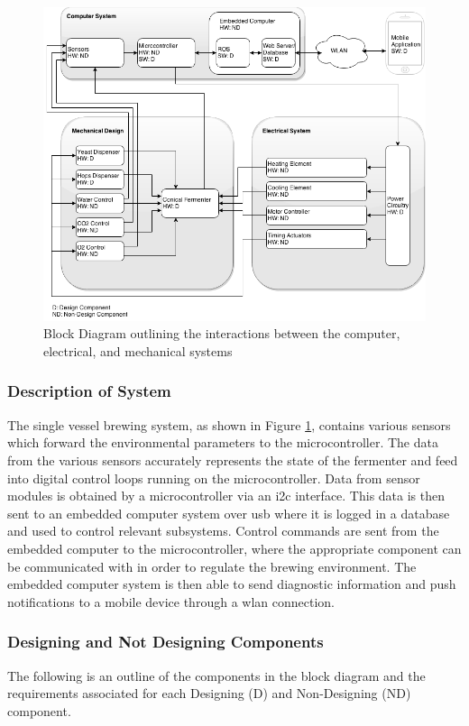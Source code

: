 \documentclass{article}
\begin{document}
\begin{figure}[H]
\begin{center}
\includegraphics[scale=0.58]{block-diagram.png}
\caption{Block Diagram outlining the interactions between the computer, electrical, and mechanical systems}
\label{fig:block}
\end{center}
\end{figure}

\subsubsection{Description of System}
The single vessel brewing system, as shown in Figure \ref{fig:block}, contains various sensors which forward the environmental parameters to the microcontroller. The data from the various sensors accurately represents the state of the fermenter and feed into digital control loops running on the microcontroller.  Data from sensor modules is obtained by a microcontroller via an \gls{i2c} interface. This data is then sent to an embedded computer system over \gls{usb} where it is logged in a database and used to control relevant subsystems. Control commands are sent from the embedded computer to the microcontroller, where the appropriate component can be communicated with in order to regulate the brewing environment.  The embedded computer system is then able to send diagnostic information and push notifications to a mobile device through a \gls{wlan} connection.

\subsubsection{Designing and Not Designing Components}
The following is an outline of the components in the block diagram and the requirements associated for each Designing (D) and Non-Designing (ND) component.
\end{document}
